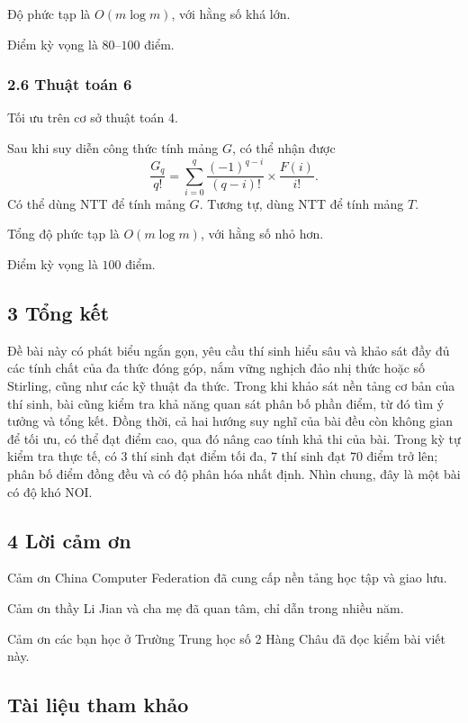 \documentclass[11pt]{article}
\begin{document}
Độ phức tạp là \(O(m\log m)\), với hằng số khá lớn.

Điểm kỳ vọng là \(80\)--\(100\) điểm.

\subsubsection*{2.6 Thuật toán 6}

Tối ưu trên cơ sở thuật toán 4.

Sau khi suy diễn công thức tính mảng \(G\), có thể nhận được
\[
  \frac{G_q}{q!}
  =\sum_{i=0}^{q}\frac{(-1)^{q-i}}{(q-i)!}\times\frac{F(i)}{i!}.
\]
Có thể dùng NTT để tính mảng \(G\). Tương tự, dùng NTT để tính mảng \(T\).

Tổng độ phức tạp là \(O(m\log m)\), với hằng số nhỏ hơn.

Điểm kỳ vọng là \(100\) điểm.

\subsection*{3 Tổng kết}

Đề bài này có phát biểu ngắn gọn, yêu cầu thí sinh hiểu sâu và khảo sát đầy đủ
các tính chất của đa thức đóng góp, nắm vững nghịch đảo nhị thức hoặc số
Stirling, cũng như các kỹ thuật đa thức. Trong khi khảo sát nền tảng cơ bản của
thí sinh, bài cũng kiểm tra khả năng quan sát phân bố phần điểm, từ đó tìm ý
tưởng và tổng kết. Đồng thời, cả hai hướng suy nghĩ của bài đều còn không gian
để tối ưu, có thể đạt điểm cao, qua đó nâng cao tính khả thi của bài. Trong
kỳ tự kiểm tra thực tế, có \(3\) thí sinh đạt điểm tối đa, \(7\) thí sinh đạt
\(70\) điểm trở lên; phân bố điểm đồng đều và có độ phân hóa nhất định. Nhìn
chung, đây là một bài có độ khó NOI.

\subsection*{4 Lời cảm ơn}

Cảm ơn China Computer Federation đã cung cấp nền tảng học tập và giao lưu.

Cảm ơn thầy Li Jian và cha mẹ đã quan tâm, chỉ dẫn trong nhiều năm.

Cảm ơn các bạn học ở Trường Trung học số 2 Hàng Châu đã đọc kiểm bài viết này.

\subsection*{Tài liệu tham khảo}
\end{document}
